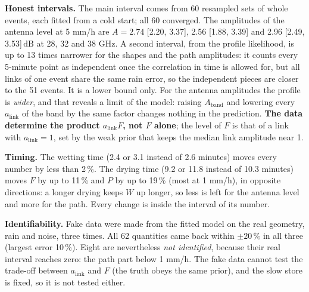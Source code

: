 \documentclass[11pt,a4paper]{article}
\newcommand{\dB}{\,\mathrm{dB}}
\begin{document}
\textbf{Honest intervals.} The main interval comes from 60 resampled sets of whole events, each fitted from a cold
start; all 60 converged. The amplitudes of the antenna level at 5 mm/h are $A = 2.74$ [2.20, 3.37], 2.56 [1.88, 3.39]
and 2.96 [2.49, 3.53]$\dB$ at 28, 32 and 38 GHz. A second interval, from the profile likelihood, is up to 13 times
narrower for the shapes and the path amplitudes: it counts every 5-minute point as independent once the correlation
in time is allowed for, but all links of one event share the same rain error, so the independent pieces are closer to
the 51 events. It is a lower bound only. For the antenna amplitudes the profile is \emph{wider}, and that reveals a
limit of the model: raising $A_{\mathrm{band}}$ and lowering every $a_{\mathrm{link}}$ of the band by the same factor
changes nothing in the prediction. \textbf{The data determine the product $a_{\mathrm{link}}F$, not $F$ alone}; the
level of $F$ is that of a link with $a_{\mathrm{link}} = 1$, set by the weak prior that keeps the median link
amplitude near 1.

\textbf{Timing.} The wetting time (2.4 or 3.1 instead of 2.6 minutes) moves every number by less than 2\,\%. The drying
time (9.2 or 11.8 instead of 10.3 minutes) moves $F$ by up to 11\,\% and $P$ by up to 19\,\% (most at 1 mm/h), in
opposite directions: a longer drying keeps $W$ up longer, so less is left for the antenna level and more for the path.
Every change is inside the interval of its number.

\textbf{Identifiability.} Fake data were made from the fitted model on the real geometry, rain and noise, three times.
All 62 quantities came back within $\pm 20\,\%$ in all three (largest error 10\,\%). Eight are nevertheless
\emph{not identified}, because their real interval reaches zero: the path part below 1 mm/h. The fake data cannot test
the trade-off between $a_{\mathrm{link}}$ and $F$ (the truth obeys the same prior), and the slow store is fixed, so it
is not tested either.
\end{document}
